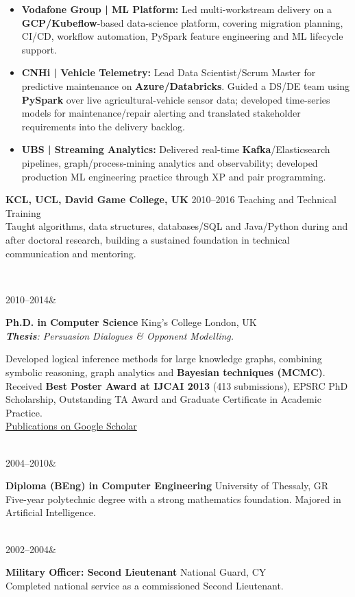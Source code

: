 \documentclass[]{../../../../friggeri-cv}
\renewcommand{\entry}[4]{%
  \parbox[t]{\dimexpr\textwidth-\entryleftinset\relax}{%
    \textbf{#2}%
    {\footnotesize\addfontfeature{Color=lightgray}\hspace{0.6em}#1}%
    \hfill%
    {\small\color{textcolor} #3}\\%
    #4\vspace{\parsep}%
  }\\}
\renewcommand{\entrytwo}[4]{%
  #1&\parbox[t]{14cm}{%
    \textbf{#2}%
    \hfill%
    {\small\color{textcolor} #3}\\%
    #4\vspace{\parsep}%
  }\\}
\begin{document}
\begin{entrylist}
{{        }
        \begin{itemize}[leftmargin=1.1em, itemsep=2pt, topsep=3pt, parsep=0pt]
            \item \small\textbf{Vodafone Group | ML Platform:} Led multi-workstream delivery on a \textbf{GCP/Kubeflow}-based data-science platform, covering migration planning, CI/CD, workflow automation, PySpark feature engineering and ML lifecycle support.
            \item \small\textbf{CNHi | Vehicle Telemetry:} Lead Data Scientist/Scrum Master for predictive maintenance on \textbf{Azure/Databricks}. Guided a DS/DE team using \textbf{PySpark} over live agricultural-vehicle sensor data; developed time-series models for maintenance/repair alerting and translated stakeholder requirements into the delivery backlog.
            \item \small\textbf{UBS | Streaming Analytics:} Delivered real-time \textbf{Kafka}/Elasticsearch pipelines, graph/process-mining analytics and observability; developed production ML engineering practice through XP and pair programming.
        \end{itemize}
    }
    \entry
    {2010--2016}
    {KCL, UCL, David Game College, UK}
    {Teaching and Technical Training}
    {\small Taught algorithms, data structures, databases/SQL and Java/Python during and after doctoral research, building a sustained foundation in technical communication and mentoring.}
\end{entrylist}
\newpage
\setlength{\parskip}{2pt}
\setlength{\parsep}{0pt}
\begin{entrylist2}
    \entrytwo
        {\small 2010--2014}
        {\small Ph.D. in Computer Science}
        {\small King's College London, UK}
        {\small \emph{\textbf{Thesis}: Persuasion Dialogues \& Opponent Modelling.}

        {\small Developed logical inference methods for large knowledge graphs, combining symbolic reasoning, graph analytics and \textbf{Bayesian techniques (MCMC)}. Received \textbf{Best Poster Award at IJCAI 2013} (413 submissions), EPSRC PhD Scholarship, Outstanding TA Award and Graduate Certificate in Academic Practice.
        \\ \href{https://scholar.google.com/citations?hl=en&user=Rr3KTx8AAAAJ}{Publications on Google Scholar}}
        }
    \entrytwo
        {\small 2004--2010}
        {\small Diploma (BEng) in Computer Engineering}
        {\small University of Thessaly, GR}
        {\small Five-year polytechnic degree with a strong mathematics foundation. Majored in Artificial Intelligence.}
    \entrytwo
        {\small 2002--2004}
        {\small Military Officer: Second Lieutenant}
        {\small National Guard, CY}
        {\small Completed national service as a commissioned Second Lieutenant.}
\end{entrylist2}
\end{document}
